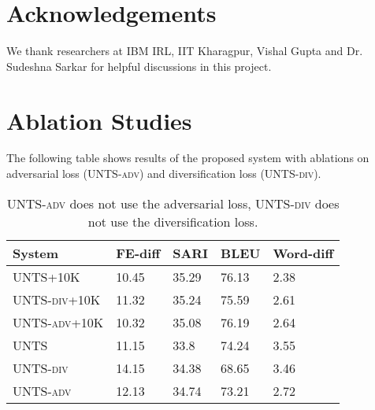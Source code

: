 \documentclass[11pt,a4paper]{article}
\begin{document}
 \section{Acknowledgements}
We thank researchers at IBM IRL, IIT Kharagpur, Vishal Gupta and Dr. Sudeshna Sarkar for helpful discussions in this project. 





\appendix

\section{Ablation Studies}
\label{appendix:ablation}
The following table shows results of the proposed system with ablations on adversarial loss (\textsc{UNTS-adv}) and diversification loss (\textsc{UNTS-div}).
\begin{table}[H]
\centering
\scriptsize
\begin{tabular}{lllll}
\toprule
\textbf{System} & \textbf{FE-diff} & \textbf{SARI} & \textbf{BLEU} & \textbf{Word-diff} \\
\midrule
\textsc{UNTS}+10K & 10.45 & 35.29 & 76.13 & 2.38 \\
\textsc{UNTS-div}+10K & 11.32 & 35.24 & 75.59 & {2.61} \\ \textsc{UNTS-adv}+10K & 10.32 & 35.08 & 76.19 & {2.64} \\ \midrule
\textsc{UNTS} & 11.15 & 33.8 & 74.24 & {3.55} \\
\textsc{UNTS-div} & 14.15 & 34.38 & 68.65 & {3.46}\\
\textsc{UNTS-adv} & 12.13 & 34.74 & 73.21 & {2.72}\\\hline
\end{tabular}
\caption{\textsc{UNTS-adv} does not use the adversarial loss, \textsc{UNTS-div} does not use the diversification loss.}
\label{tab:ablation-1} 
\end{table}
\end{document}
